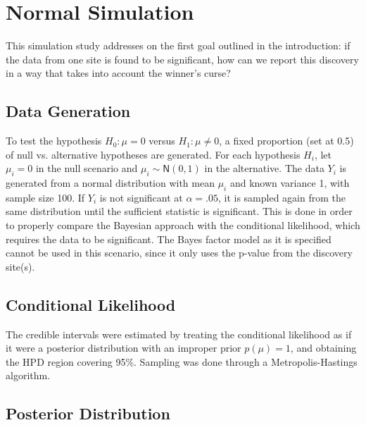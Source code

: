 \documentclass[AMA,STIX1COL]{WileyNJD-v2}\usepackage[]{graphicx}\usepackage[]{color}
\begin{document}
\section{Normal Simulation}\label{sec:normal}

This simulation study addresses on the first goal outlined in the introduction: if the data from one site is found to be significant, how can we report this discovery in a way that takes into account the winner's curse? 

\subsection{Data Generation}

To test the hypothesis $H_0: \mu = 0$ versus  $H_1: \mu \neq 0$, a fixed proportion (set at 0.5) of null vs. alternative hypotheses are generated. For each hypothesis $H_i$, let $\mu_i = 0$ in the null scenario and $\mu_i \sim \textsf{N}(0,1)$ in the alternative. The data $Y_i$ is generated from a normal distribution with mean $\mu_i$ and known variance 1, with sample size 100. If $Y_i$ is not significant at $\alpha = .05$, it is sampled again from the same distribution until the sufficient statistic is significant. This is done in order to properly compare the Bayesian approach with the conditional likelihood, which requires the data to be significant. The Bayes factor model as it is specified cannot be used in this scenario, since it only uses the p-value from the discovery site(s).

\subsection{Conditional Likelihood}

The credible intervals were estimated by treating the conditional likelihood as if it were a posterior distribution with an improper prior $p(\mu) = 1$, and obtaining the HPD region covering 95\%. Sampling was done through a Metropolis-Hastings algorithm.

\subsection{Posterior Distribution}
\end{document}
